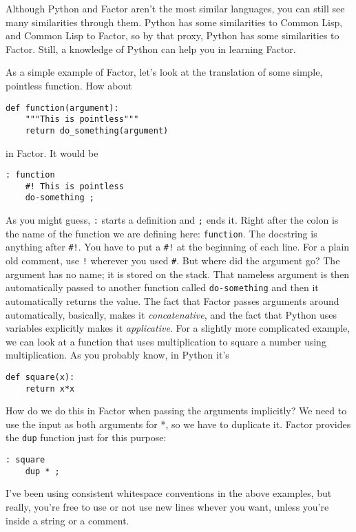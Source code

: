 \documentclass{article}
\begin{document}
Although Python and Factor aren't the most similar languages, you can still see many similarities through them. Python has some similarities to Common Lisp, and Common Lisp to Factor, so by that proxy, Python has some similarities to Factor. Still, a knowledge of Python can help you in learning Factor.

As a simple example of Factor, let's look at the translation of some simple, pointless function. How about
\begin{verbatim}
def function(argument):
    """This is pointless"""
    return do_something(argument)
\end{verbatim}
in Factor. It would be
\begin{verbatim}
: function
    #! This is pointless
    do-something ;
\end{verbatim}
As you might guess, \texttt{:} starts a definition and \texttt{;} ends it. Right after the colon is the name of the function we are defining here: \texttt{function}. The docstring is anything after \texttt{#!}. You have to put a \texttt{#!} at the beginning of each line. For a plain old comment, use \texttt{!} wherever you used \texttt{#}. But where did the argument go? The argument has no name; it is stored on the stack. That nameless argument is then automatically passed to another function called \texttt{do-something} and then it automatically returns the value. The fact that Factor passes arguments around automatically, basically, makes it \emph{concatenative}, and the fact that Python uses variables explicitly makes it \emph{applicative}. For a slightly more complicated example, we can look at a function that uses multiplication to square a number using multiplication. As you probably know, in Python it's
\begin{verbatim}
def square(x):
    return x*x
\end{verbatim}
How do we do this in Factor when passing the arguments implicitly? We need to use the input as both arguments for *, so we have to duplicate it. Factor provides the \texttt{dup} function just for this purpose:
\begin{verbatim}
: square
    dup * ;
\end{verbatim}
I've been using consistent whitespace conventions in the above examples, but really, you're free to use or not use new lines whever you want, unless you're inside a string or a comment.
\end{document}
